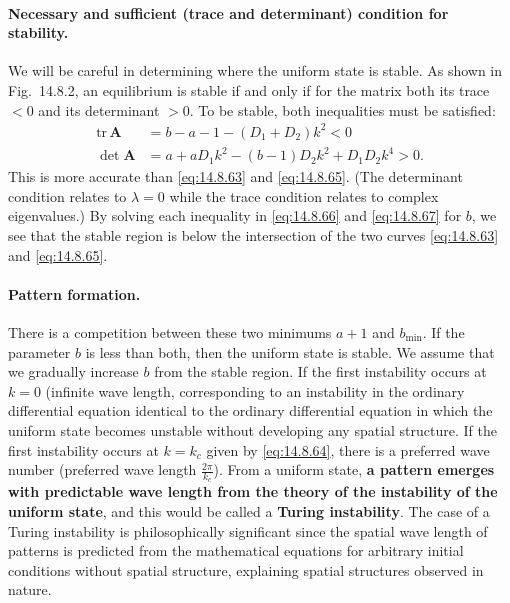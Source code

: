 \paragraph{Necessary and sufficient (trace and determinant) condition for stability.}
We will be careful in determining where the uniform state is stable. As shown in Fig.\ 14.8.2, an equilibrium is stable if and only if for the matrix both its trace $< 0$ and its determinant $> 0$. To be stable, both inequalities must be satisfied:
\begin{align}
\text{tr}\,\boldsymbol{A} &= b - a - 1 - (D_1 + D_2)k^2 < 0 \label{eq:14.8.66} \\
\det\boldsymbol{A} &= a + aD_1 k^2 - (b-1)D_2 k^2 + D_1 D_2 k^4 > 0. \label{eq:14.8.67}
\end{align}
This is more accurate than \eqref{eq:14.8.63} and \eqref{eq:14.8.65}. (The determinant condition relates to $\lambda = 0$ while the trace condition relates to complex eigenvalues.) By solving each inequality in \eqref{eq:14.8.66} and \eqref{eq:14.8.67} for $b$, we see that the stable region is below the intersection of the two curves \eqref{eq:14.8.63} and \eqref{eq:14.8.65}.

\paragraph{Pattern formation.}
There is a competition between these two minimums $a + 1$ and $b_{\min}$. If the parameter $b$ is less than both, then the uniform state is stable. We assume that we gradually increase $b$ from the stable region. If the first instability occurs at $k = 0$ (infinite wave length, corresponding to an instability in the ordinary differential equation identical to the ordinary differential equation in which the uniform state becomes unstable without developing any spatial structure. If the first instability occurs at $k = k_c$ given by \eqref{eq:14.8.64}, there is a preferred wave number (preferred wave length $\frac{2\pi}{k_c}$). From a uniform state, \textbf{a pattern emerges with predictable wave length from the theory of the instability of the uniform state}, and this would be called a \textbf{Turing instability}. The case of a Turing instability is philosophically significant since the spatial wave length of patterns is predicted from the mathematical equations for arbitrary initial conditions without spatial structure, explaining spatial structures observed in nature.

